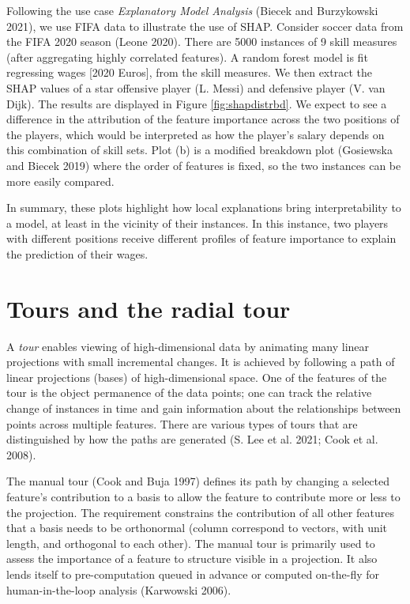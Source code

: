 \documentclass[
]{article}
\begin{document}
Following the use case \emph{Explanatory Model Analysis} (Biecek and Burzykowski 2021), we use FIFA data to illustrate the use of SHAP. Consider soccer data from the FIFA 2020 season (Leone 2020). There are 5000 instances of 9 skill measures (after aggregating highly correlated features). A random forest model is fit regressing wages {[}2020 Euros{]}, from the skill measures. We then extract the SHAP values of a star offensive player (L. Messi) and defensive player (V. van Dijk). The results are displayed in Figure \ref{fig:shapdistrbd}. We expect to see a difference in the attribution of the feature importance across the two positions of the players, which would be interpreted as how the player's salary depends on this combination of skill sets. Plot (b) is a modified breakdown plot (Gosiewska and Biecek 2019) where the order of features is fixed, so the two instances can be more easily compared.

In summary, these plots highlight how local explanations bring interpretability to a model, at least in the vicinity of their instances. In this instance, two players with different positions receive different profiles of feature importance to explain the prediction of their wages.

\hypertarget{sec:tour}{%
\section{Tours and the radial tour}\label{sec:tour}}

A \emph{tour} enables viewing of high-dimensional data by animating many linear projections with small incremental changes. It is achieved by following a path of linear projections (bases) of high-dimensional space. One of the features of the tour is the object permanence of the data points; one can track the relative change of instances in time and gain information about the relationships between points across multiple features. There are various types of tours that are distinguished by how the paths are generated (S. Lee et al. 2021; Cook et al. 2008).

The manual tour (Cook and Buja 1997) defines its path by changing a selected feature's contribution to a basis to allow the feature to contribute more or less to the projection. The requirement constrains the contribution of all other features that a basis needs to be orthonormal (column correspond to vectors, with unit length, and orthogonal to each other). The manual tour is primarily used to assess the importance of a feature to structure visible in a projection. It also lends itself to pre-computation queued in advance or computed on-the-fly for human-in-the-loop analysis (Karwowski 2006).
\end{document}
